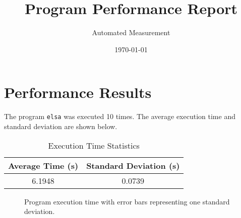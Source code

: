 \documentclass{article}
\title{Program Performance Report}
\author{Automated Measurement}
\date{\today}
\begin{document}
\maketitle

\section{Performance Results}

The program \texttt{elsa} was executed 10 times. The average execution time and standard deviation are shown below.

\begin{table}[h]
\centering
\begin{tabular}{cc}
\toprule
Average Time (s) & Standard Deviation (s) \\
\midrule
6.1948 & 0.0739 \\
\bottomrule
\end{tabular}
\caption{Execution Time Statistics}
\end{table}

\begin{figure}[h]
\centering

\caption{Program execution time with error bars representing one standard deviation.}
\end{figure}
\end{document}
